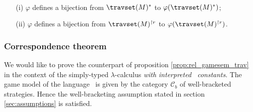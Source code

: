 \begin{cor} \
\label{cor:SIGMACONST:varphi_bij}
\begin{itemize}
\item[(i)] $\varphi$ defines a bijection from $\travset(M)^*$
to $\varphi(\travset(M)^*)$;
\item[(ii)] $\varphi$ defines a bijection from $\travset(M)^{\upharpoonright r}$ to
$\varphi(\travset(M)^{\upharpoonright r})$.
\end{itemize}
\end{cor}


\subsubsection{Correspondence theorem}
We would like to prove the counterpart of proposition \ref{prop:rel_gamesem_trav}
in the context of the simply-typed $\lambda$-calculus \emph{with interpreted \pcf\ constants}.
The game model of the language \pcf\ is given by the category $\mathcal{C}_b$ of
well-bracketed strategies. Hence the well-bracketing assumption stated in section \ref{sec:assumptions} is satisfied.

